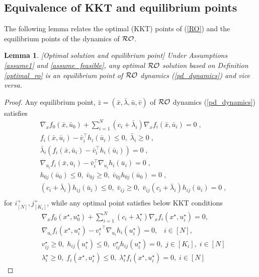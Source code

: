\documentclass[journal,twoside,web]{ieeecolor}
\newtheorem{lemma}{Lemma}
\begin{document}
\subsection{{\color{blue}Equivalence of KKT and equilibrium points}} \label{kkt<=>eq.sec}
 The following lemma relates the optimal (KKT) points of (\ref{RO}) and the equilibrium points of the dynamics of ${\cal RO}$.
\begin{lemma}\label{kkttoeq.lem}[Optimal solution and equilibrium point]
Under Assumptions \ref{assume1} and \ref{assume_feasible}, any optimal ${\cal RO}$ solution based on Definition \ref{optimal_ro} is an equilibrium point of ${\cal RO}$ dynamics (\ref{pd_dynamics}) and vice versa.
\end{lemma}
\begin{proof}
Any equilibrium point, $\bar{z}=(\bar{x},\bar{\lambda},\bar{u},\bar{v})$  of ${\cal RO}$ dynamics (\ref{pd_dynamics}) satisfies
\begin{align*}
&\nabla_x f_0(\bar x,\bar{u}_0)+  \sum_{i=1}^N (c_i+\bar \lambda_i) \nabla_x f_i(\bar x,\bar u_i)=0\;,\\
&f_{i}(\bar x,\bar u_i)-\bar v_i^\top h_i(\bar u_i)\leq 0,\;\bar \lambda_i\geq 0\;,\\
&\bar \lambda_i(f_{i}(\bar x,\bar u_i)-\bar v_i^\top h_i(\bar u_i))=0\;,\\
&\nabla_{u_i} f_i(\bar x,\bar u_i)-\bar v_i^\top \nabla_{u_i} h_i(\bar u_i)=0\;,\\
&h_{0j}(\bar u_0)\leq 0,\; \bar v_{0j}\geq 0,\;\bar v_{0j}h_{0j}(\bar u_0)=0\;,\\
& (c_i+\bar{\lambda}_i) h_{ij}(\bar u_i)\leq 0,\; \bar v_{ij}\geq 0,\;\bar v_{ij}(c_i+\bar \lambda_i) h_{ij}(\bar u_i)=0\;,\\
\end{align*}
for $i^+_{[N]},j^+_{[K_i]}$, while any optimal point satisfies below KKT conditions
\begin{align}
    &\nabla_x f_0(x^\star,u_0^\star)+  \sum_{i=1}^N(c_i+\lambda^\star_i) \nabla_x f_i(x^\star,u_i^\star)=0, \label{kkt1} \\
    &\nabla_{u_i} f_i(x^\star,u_i^\star)-{v_i^\star}^\top \nabla_{u_i} h_i(u_i^\star)=0, \;\;\; i \in [N], \label{kkt2} \\
    &v_{ij}^\star\geq 0,\; h_{ij}(u_i^\star)\leq 0,\;v_{ij}^\star h_{ij}(u_i^\star)=0, \; j \in [K_i], \; i \in [N] \label{kkt3} \\
    &\lambda_i^\star\geq 0,\;f_{i}(x^\star,u_i^\star)\leq 0,\;\lambda_i^\star f_{i}(x^\star,u_i^\star)=0, \; i \in [N] \label{kkt4}
\end{align}


\end{proof}
\end{document}
